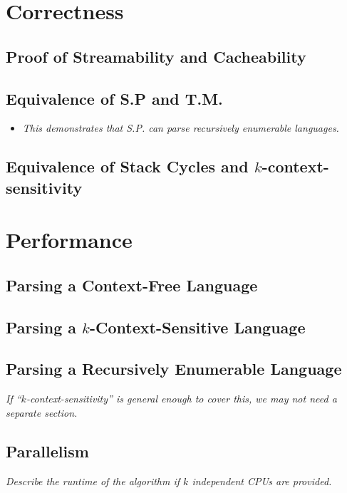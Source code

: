 \documentclass{article}
\begin{document}
\section{Correctness}
\subsection{Proof of Streamability and Cacheability}
\subsection{Equivalence of S.P and T.M.}
\begin{itemize}
  \item \textit{This demonstrates that S.P. can parse recursively enumerable languages.}
\end{itemize}
\subsection{Equivalence of Stack Cycles and $k$-context-sensitivity}

\section{Performance}
\subsection{Parsing a Context-Free Language}
\subsection{Parsing a $k$-Context-Sensitive Language}
\subsection{Parsing a Recursively Enumerable Language}
\textit{If ``$k$-context-sensitivity'' is general enough to cover this, we may not need a separate section.}

\subsection{Parallelism}
\textit{Describe the runtime of the algorithm if $k$ independent CPUs are provided.}
\end{document}
